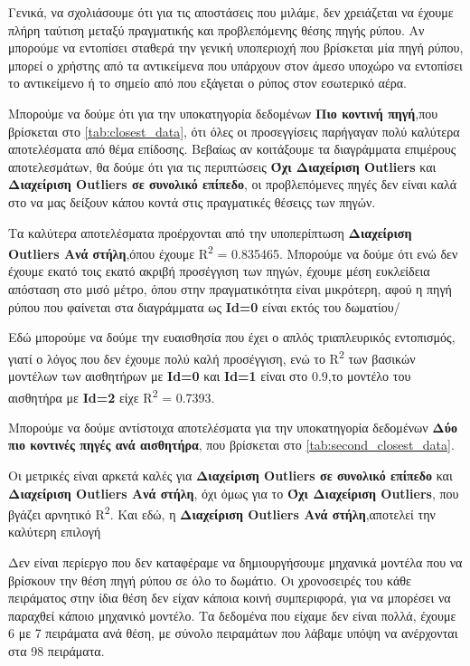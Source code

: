 Γενικά, να σχολιάσουμε ότι για τις αποστάσεις που μιλάμε, δεν χρειάζεται να έχουμε πλήρη ταύτιση μεταξύ πραγματικής και προβλεπόμενης θέσης πηγής ρύπου.
Αν μπορούμε να εντοπίσει σταθερά την γενική υποπεριοχή που βρίσκεται μία πηγή ρύπου, μπορεί ο χρήστης από τα αντικείμενα που υπάρχουν στον άμεσο υποχώρο να εντοπίσει το αντικείμενο ή το σημείο από που εξάγεται ο ρύπος στον εσωτερικό αέρα.

Μπορούμε να δούμε ότι για την υποκατηγορία δεδομένων \textbf{Πιο κοντινή πηγή},που βρίσκεται στο \autoref{tab:closest_data},
ότι όλες οι προσεγγίσεις παρήγαγαν πολύ καλύτερα αποτελέσματα από θέμα επίδοσης.
Βεβαίως αν κοιτάξουμε τα διαγράμματα επιμέρους αποτελεσμάτων, θα δούμε ότι για τις περιπτώσεις \textbf{Όχι Διαχείριση Outliers} και \textbf{Διαχείριση Outliers σε συνολικό επίπεδο},
οι προβλεπόμενες πηγές δεν είναι καλά στο να μας δείξουν κάπου κοντά στις πραγματικές θέσειςς των πηγών.

Τα καλύτερα αποτελέσματα προέρχονται από την υποπερίπτωση \textbf{Διαχείριση Outliers Ανά στήλη},όπου έχουμε R\textsuperscript{2} = 0.835465.
Μπορούμε να δούμε ότι ενώ δεν έχουμε εκατό τοις εκατό ακριβή προσέγγιση των πηγών, έχουμε μέση ευκλείδεια απόσταση στο μισό μέτρο, όπου στην πραγματικότητα είναι μικρότερη,
αφού η πηγή ρύπου που φαίνεται στα διαγράμματα ως \textbf{Id=0} είναι εκτός του δωματίου/

Εδώ μπορούμε να δούμε την ευαισθησία που έχει ο απλός τριαπλευρικός εντοπισμός,
γιατί ο λόγος που δεν έχουμε πολύ καλή προσέγγιση, ενώ το R\textsuperscript{2} των 
βασικών μοντέλων των αισθητήρων με \textbf{Id=0} και \textbf{Id=1} είναι στο 0.9,το μοντέλο του αισθητήρα  με \textbf{Id=2} είχε R\textsuperscript{2} = 0.7393.

Μπορούμε να δούμε αντίστοιχα αποτελέσματα για την υποκατηγορία δεδομένων \textbf{Δύο πιο κοντινές πηγές ανά αισθητήρα}, που βρίσκεται στο \autoref{tab:second_closest_data}.

Οι μετρικές είναι αρκετά καλές για \textbf{Διαχείριση Outliers σε συνολικό επίπεδο} και \textbf{Διαχείριση Outliers Ανά στήλη}, όχι όμως για το \textbf{Όχι Διαχείριση Outliers},
που βγάζει αρνητικό R\textsuperscript{2}.
Και εδώ, η \textbf{Διαχείριση Outliers Ανά στήλη},αποτελεί την καλύτερη επιλογή

Δεν είναι περίεργο που δεν καταφέραμε να δημιουργήσουμε μηχανικά μοντέλα που να βρίσκουν την θέση πηγή ρύπου σε όλο το δωμάτιο.
Οι χρονοσειρές του κάθε πειράματος στην ίδια θέση δεν είχαν κάποια κοινή συμπεριφορά, για να μπορέσει να παραχθεί κάποιο μηχανικό μοντέλο.
Τα δεδομένα που είχαμε δεν είναι πολλά, έχουμε 6 με 7 πειράματα ανά θέση, με σύνολο πειραμάτων που λάβαμε υπόψη να ανέρχονται στα 98 πειράματα. 

